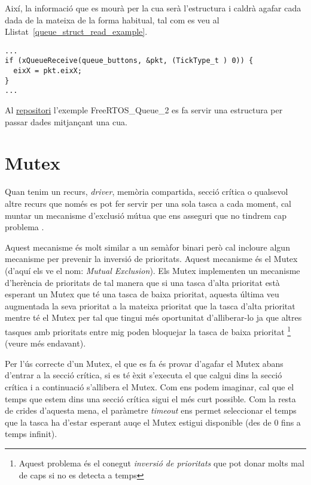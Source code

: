 Així, la informació que es mourà per la cua serà l'estructura i caldrà agafar cada dada de la mateixa de la forma habitual, tal com es veu al Llistat~\ref{queue_struct_read_example}.

\begin{lstlisting}[style=customc, label=queue_struct_read_example, caption=Rebre un paquet de dades de la cua]
...
if (xQueueReceive(queue_buttons, &pkt, (TickType_t ) 0)) {
  eixX = pkt.eixX;
}
...
\end{lstlisting}

Al \href{https://github.com/mariusmm/cursembedded/tree/master/Simplicity/FreeRTOS_Queue_2}{repositori} l'exemple FreeRTOS\_Queue\_2 es fa servir una estructura per passar dades mitjançant una cua. 


\section{Mutex}
\label{sec:Mutex}
Quan tenim un recurs, {\em driver}, memòria compartida, secció crítica o qualsevol altre recurs que només es pot fer servir per una sola tasca a cada moment, cal muntar un mecanisme d'exclusió mútua que ens asseguri que no tindrem cap problema \cite[244]{FreeRTOSBook}.

Aquest mecanisme és molt similar a un semàfor binari però cal incloure algun mecanisme per prevenir la inversió de prioritats. Aquest mecanisme és el Mutex (d'aquí els ve el nom: {\em Mutual Exclusion}). Els Mutex implementen un mecanisme d'herència de prioritats de tal manera que si una tasca d'alta prioritat està esperant un Mutex que té una tasca de baixa prioritat, aquesta última veu augmentada la seva prioritat a la mateixa prioritat que la tasca d'alta prioritat mentre té el Mutex per tal que tingui més oportunitat d'alliberar-lo ja que altres tasques amb prioritats entre mig poden bloquejar la tasca de baixa prioritat \footnote{Aquest problema és el conegut {\em inversió de prioritats} que pot donar molts mal de caps si no es detecta a temps} (veure  més endavant).

Per l'ús correcte d'un Mutex, el que es fa és provar d'agafar el Mutex abans d'entrar a la secció crítica, si es té èxit s'executa el que calgui dins la secció crítica i a continuació s'allibera el Mutex. Com ens podem imaginar, cal que el temps que estem dins una secció crítica sigui el més curt possible. Com la resta de crides d'aquesta mena, el paràmetre {\em timeout} ens permet seleccionar el temps que la tasca ha d'estar esperant auqe el Mutex estigui disponible (des de 0 fins a temps infinit).

